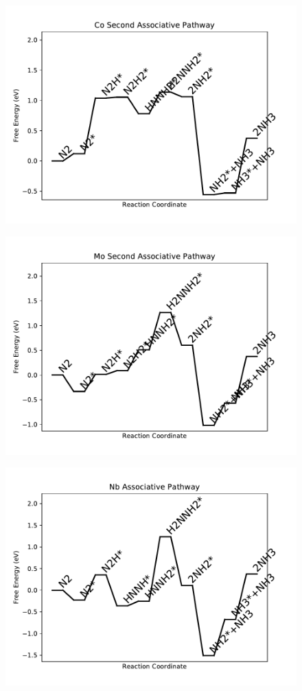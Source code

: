 \begin{figure}
\centering
\includegraphics[width=0.8\linewidth]{data/plots/Co_associative_2.pdf}
\end{figure}

\begin{figure}
\centering
\includegraphics[width=0.8\linewidth]{data/plots/Mo_associative_2.pdf}
\end{figure}

\begin{figure}
\centering
\includegraphics[width=0.8\linewidth]{data/plots/Nb_associative.pdf}
\end{figure}

